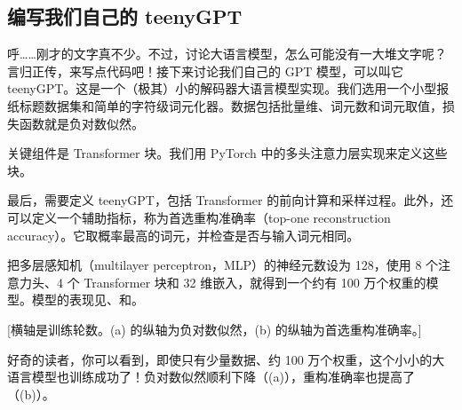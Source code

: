 \subsection{编写我们自己的 teenyGPT}
呼……刚才的文字真不少。不过，讨论大语言模型，怎么可能没有一大堆文字呢？言归正传，来写点代码吧！接下来讨论我们自己的 GPT 模型，可以叫它 teenyGPT。这是一个（极其）小的解码器大语言模型实现。我们选用一个小型报纸标题数据集和简单的字符级词元化器。数据包括批量维、词元数和词元取值，损失函数就是负对数似然。


关键组件是 Transformer 块。我们用 PyTorch 中的多头注意力层实现来定义这些块。


最后，需要定义 teenyGPT，包括 Transformer 的前向计算和采样过程。此外，还可以定义一个辅助指标，称为首选重构准确率（top-one reconstruction accuracy）。它取概率最高的词元，并检查是否与输入词元相同。


把多层感知机（multilayer perceptron，MLP）的神经元数设为 128，使用 8 个注意力头、4 个 Transformer 块和 32 维嵌入，就得到一个约有 100 万个权重的模型。模型的表现见、和。

[横轴是训练轮数。(a) 的纵轴为负对数似然，(b) 的纵轴为首选重构准确率。]

好奇的读者，你可以看到，即使只有少量数据、约 100 万个权重，这个小小的大语言模型也训练成功了！负对数似然顺利下降（(a)），重构准确率也提高了（(b)）。

